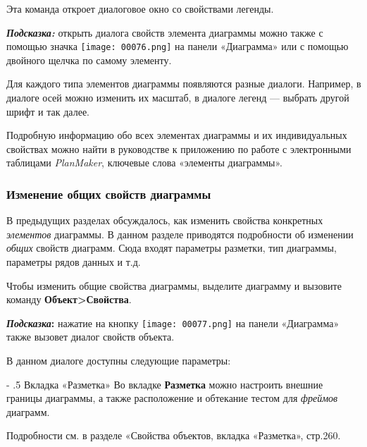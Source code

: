 \documentclass[a4paper,10pt]{article}
\makeatletter
\renewcommand\paragraph{%
   \@startsection{paragraph}{4}{0mm}%
      {-\baselineskip}%
      {.5\baselineskip}%
      {\normalfont\normalsize\bfseries}}
\makeatother
\begin{document}
Эта команда откроет диалоговое окно со свойствами легенды.

\begin{mdframed}[backgroundcolor=blue!10]
\textbf{\textit{Подсказка:}} открыть диалога свойств элемента диаграммы можно также с помощью значка \texttt{[image: 00076.png]} на панели «Диаграмма» или с помощью двойного щелчка по самому элементу.
\end{mdframed}

Для каждого типа элементов диаграммы появляются разные диалоги. Например, в диалоге осей можно изменить их масштаб, в диалоге легенд --- выбрать другой шрифт и так далее.

\begin{mdframed}[backgroundcolor=blue!10]
Подробную информацию обо всех элементах диаграммы и их индивидуальных свойствах можно найти в руководстве к приложению по работе с электронными таблицами \textit{PlanMaker}, ключевые слова «элементы диаграммы».
\end{mdframed}

\subsubsection{Изменение общих свойств диаграммы}
В предыдущих разделах обсуждалось, как изменить свойства конкретных \textit{элементов} диаграммы. В данном разделе приводятся подробности об изменении \textit{общих} свойств диаграмм. Сюда входят параметры разметки, тип диаграммы, параметры рядов данных и т.д.

Чтобы изменить общие свойства диаграммы, выделите диаграмму и вызовите команду \textbf{Объект>Свойства}.

\begin{mdframed}[backgroundcolor=blue!10]
\textbf{\textit{Подсказка}:} нажатие на кнопку \texttt{[image: 00077.png]} на панели «Диаграмма» также вызовет диалог свойств объекта.
\end{mdframed}

В данном диалоге доступны следующие параметры:

\paragraph{Вкладка «Разметка»}
Во вкладке \textbf{Разметка} можно настроить внешние границы диаграммы, а также расположение и обтекание тестом для \textit{фреймов} диаграмм.

Подробности см. в разделе «Свойства объектов, вкладка «Разметка», стр.260.
\end{document}
